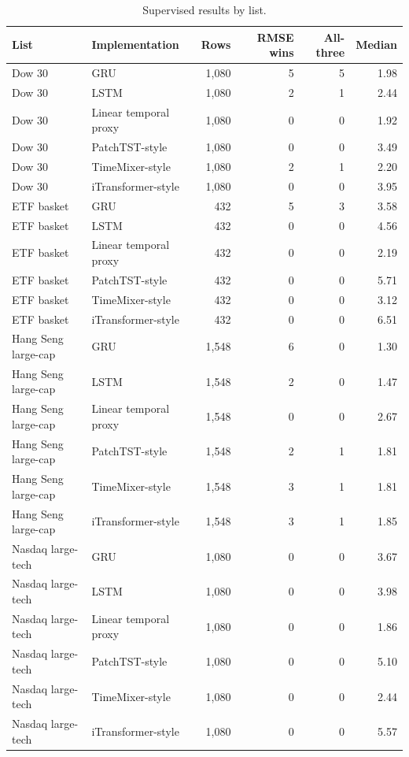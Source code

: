 \begin{table}[htbp]
\centering
\caption{Supervised results by list.}
\label{tab:sup_market}
\small
\setlength{\tabcolsep}{4pt}
\begin{tabular}{llrrrr}
\toprule
List & Implementation & Rows & RMSE wins & All-three & Median \\
\midrule
Dow 30 & GRU & 1,080 & 5 & 5 & 1.98 \\
Dow 30 & LSTM & 1,080 & 2 & 1 & 2.44 \\
Dow 30 & Linear temporal proxy & 1,080 & 0 & 0 & 1.92 \\
Dow 30 & PatchTST-style & 1,080 & 0 & 0 & 3.49 \\
Dow 30 & TimeMixer-style & 1,080 & 2 & 1 & 2.20 \\
Dow 30 & iTransformer-style & 1,080 & 0 & 0 & 3.95 \\
ETF basket & GRU & 432 & 5 & 3 & 3.58 \\
ETF basket & LSTM & 432 & 0 & 0 & 4.56 \\
ETF basket & Linear temporal proxy & 432 & 0 & 0 & 2.19 \\
ETF basket & PatchTST-style & 432 & 0 & 0 & 5.71 \\
ETF basket & TimeMixer-style & 432 & 0 & 0 & 3.12 \\
ETF basket & iTransformer-style & 432 & 0 & 0 & 6.51 \\
Hang Seng large-cap & GRU & 1,548 & 6 & 0 & 1.30 \\
Hang Seng large-cap & LSTM & 1,548 & 2 & 0 & 1.47 \\
Hang Seng large-cap & Linear temporal proxy & 1,548 & 0 & 0 & 2.67 \\
Hang Seng large-cap & PatchTST-style & 1,548 & 2 & 1 & 1.81 \\
Hang Seng large-cap & TimeMixer-style & 1,548 & 3 & 1 & 1.81 \\
Hang Seng large-cap & iTransformer-style & 1,548 & 3 & 1 & 1.85 \\
Nasdaq large-tech & GRU & 1,080 & 0 & 0 & 3.67 \\
Nasdaq large-tech & LSTM & 1,080 & 0 & 0 & 3.98 \\
Nasdaq large-tech & Linear temporal proxy & 1,080 & 0 & 0 & 1.86 \\
Nasdaq large-tech & PatchTST-style & 1,080 & 0 & 0 & 5.10 \\
Nasdaq large-tech & TimeMixer-style & 1,080 & 0 & 0 & 2.44 \\
Nasdaq large-tech & iTransformer-style & 1,080 & 0 & 0 & 5.57 \\

\end{tabular}
\end{table}
